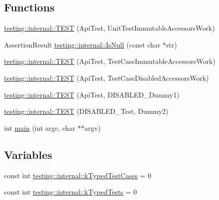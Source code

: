 \subsection*{Functions}
\begin{DoxyCompactItemize}
\item 
\hyperlink{namespacetesting_1_1internal_a9ac879683abb06d1c0bba3a339ea2f40}{testing\-::internal\-::\-T\-E\-S\-T} (Api\-Test, Unit\-Test\-Immutable\-Accessors\-Work)
\item 
Assertion\-Result \hyperlink{namespacetesting_1_1internal_adcfd37a66bc4cb0e8291cf46e1a6c72b}{testing\-::internal\-::\-Is\-Null} (const char $\ast$str)
\item 
\hyperlink{namespacetesting_1_1internal_a33809333fe5b5f33c2bd56ddcdd1dbb6}{testing\-::internal\-::\-T\-E\-S\-T} (Api\-Test, Test\-Case\-Immutable\-Accessors\-Work)
\item 
\hyperlink{namespacetesting_1_1internal_a459d693357db8f8f48c26a8bee3ffb84}{testing\-::internal\-::\-T\-E\-S\-T} (Api\-Test, Test\-Case\-Disabled\-Accessors\-Work)
\item 
\hyperlink{namespacetesting_1_1internal_a9ed5f89c92532506899e3908e79af4de}{testing\-::internal\-::\-T\-E\-S\-T} (Api\-Test, D\-I\-S\-A\-B\-L\-E\-D\-\_\-\-Dummy1)
\item 
\hyperlink{namespacetesting_1_1internal_a4a84433419426d1c1b87ce998267b0d4}{testing\-::internal\-::\-T\-E\-S\-T} (D\-I\-S\-A\-B\-L\-E\-D\-\_\-\-Test, Dummy2)
\item 
int \hyperlink{gtest-unittest-api__test_8cc_a3c04138a5bfe5d72780bb7e82a18e627}{main} (int argc, char $\ast$$\ast$argv)
\end{DoxyCompactItemize}
\subsection*{Variables}
\begin{DoxyCompactItemize}
\item 
const int \hyperlink{namespacetesting_1_1internal_a685ea5332074ae63b0ded2b184ac2271}{testing\-::internal\-::k\-Typed\-Test\-Cases} = 0
\item 
const int \hyperlink{namespacetesting_1_1internal_a53ee2d113744f9ba1d89469db4d7388b}{testing\-::internal\-::k\-Typed\-Tests} = 0
\end{DoxyCompactItemize}


